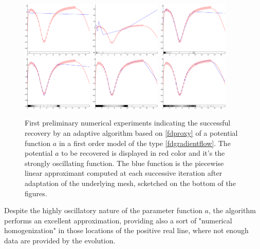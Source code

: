 \begin{figure}[h]
\begin{center}
 \includegraphics[width=0.3\textwidth]{Figure1}
\includegraphics[width=0.3\textwidth]{Figure3}
\includegraphics[width=0.3\textwidth]{Figure5}
\includegraphics[width=0.3\textwidth]{Figure7}
\includegraphics[width=0.3\textwidth]{Figure9}
\includegraphics[width=0.3\textwidth]{Figure11} 
\end{center}
\caption{First preliminary numerical experiments indicating the successful recovery by an adaptive algorithm based on \eqref{fdproxy} of a potential function $a$ in a first order model of the type \eqref{fdgradientflow}. The potential $a$ to be recovered is displayed in red color and it's the strongly oscillating function. The blue function is the piecewise linear approximant computed at each successive iteration after adaptation of the underlying mesh, scketched on the bottom of the figures.}\label{firstnum}
\end{figure}

Despite the highly oscillatory nature of the parameter function $a$, the algorithm performs an excellent approximation, providing also a sort of "numerical homogenization" in those locations of the positive real line, where not enough data are provided by the evolution.